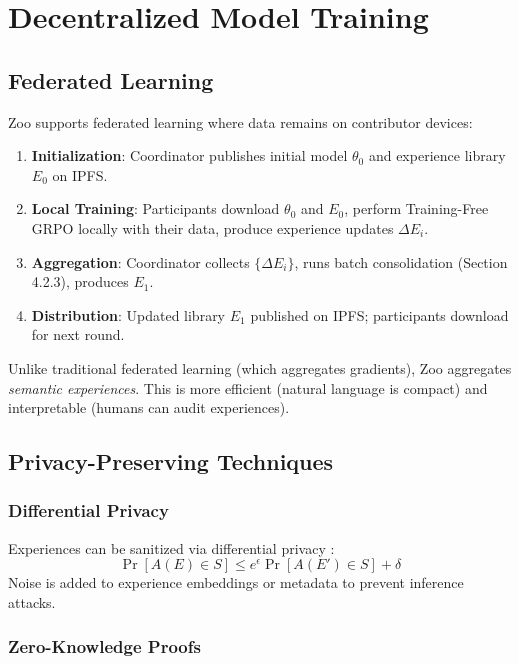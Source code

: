 \section{Decentralized Model Training}


\subsection{Federated Learning}

Zoo supports federated learning \cite{mcmahan2017federated} where data remains on contributor devices:

\begin{enumerate}
\item \textbf{Initialization}: Coordinator publishes initial model $\theta_0$ and experience library $E_0$ on IPFS.
\item \textbf{Local Training}: Participants download $\theta_0$ and $E_0$, perform Training-Free GRPO locally with their data, produce experience updates $\Delta E_i$.
\item \textbf{Aggregation}: Coordinator collects $\{\Delta E_i\}$, runs batch consolidation (Section 4.2.3), produces $E_1$.
\item \textbf{Distribution}: Updated library $E_1$ published on IPFS; participants download for next round.
\end{enumerate}

Unlike traditional federated learning (which aggregates gradients), Zoo aggregates \textit{semantic experiences}. This is more efficient (natural language is compact) and interpretable (humans can audit experiences).

\subsection{Privacy-Preserving Techniques}

\subsubsection{Differential Privacy}

Experiences can be sanitized via differential privacy \cite{dwork2014algorithmic}:
\[
\Pr[A(E) \in S] \leq e^\epsilon \Pr[A(E') \in S] + \delta
\]
Noise is added to experience embeddings or metadata to prevent inference attacks.

\subsubsection{Zero-Knowledge Proofs}

